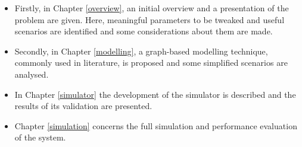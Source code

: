 \begin{itemize}
    \item Firstly, in Chapter \ref{overview}, an initial overview and a presentation of the problem are
    given. Here, meaningful parameters to be tweaked and useful scenarios are
    identified and some considerations about them are made.
    \item Secondly, in Chapter \ref{modelling}, a graph-based modelling technique, commonly used in
    literature, is proposed and some simplified scenarios are analysed.
    \item In Chapter \ref{simulator} the development of the simulator is
    described and the results of its validation are presented.
    \item Chapter \ref{simulation} concerns the full simulation and performance
    evaluation of the system.
\end{itemize}
